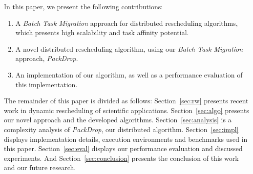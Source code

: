 In this paper, we present the following contributions: 
\begin{enumerate}
	\item A \textit{Batch Task Migration} approach for distributed rescheduling algorithms, which presents high scalability and task affinity potential.
	\item A novel distributed rescheduling algorithm, using our \textit{Batch Task Migration} approach, \textit{PackDrop}.
	\item An implementation of our algorithm, as well as a performance evaluation of this implementation.
\end{enumerate}

The remainder of this paper is divided as follows:
Section~\ref{sec:rw} presents recent work in dynamic rescheduling of scientific applications. 
Section~\ref{sec:algo} presents our novel approach and the developed algorithms. 
Section~\ref{sec:analysis} is a complexity analysis of \textit{PackDrop}, our distributed algorithm. 
Section~\ref{sec:impl} displays implementation details, execution environments and benchmarks used in this paper. 
Section~\ref{sec:eval} displays our performance evaluation and discussed experiments. 
And Section~\ref{sec:conclusion} presents the conclusion of this work and our future research.


